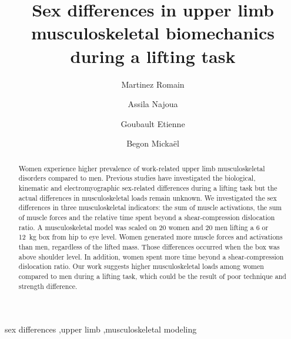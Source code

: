 \documentclass[preprint,review,12pt]{elsarticle}
\begin{document}
    \begin{frontmatter}

        \title{Sex differences in upper limb musculoskeletal biomechanics during a lifting task}



        \author{Martinez Romain}
        \author{Assila Najoua}
        \author{Goubault Etienne}
        \author{Begon Mickaël}

        \address{School of Kinesiology and Exercise Science, Faculty of Medicine, University of Montreal}

        \begin{abstract}
            Women experience higher prevalence of work-related upper limb musculoskeletal disorders compared to men.
            Previous studies have investigated the biological, kinematic and electromyographic sex-related differences during a lifting task but the actual differences in musculoskeletal loads remain unknown.
            We investigated the sex differences in three musculoskeletal indicators: the sum of muscle activations, the sum of muscle forces and the relative time spent beyond a shear-compression dislocation ratio.
            A musculoskeletal model was scaled on 20 women and 20 men lifting a 6 or 12~kg box from hip to eye level.
            Women generated more muscle forces and activations than men, regardless of the lifted mass.
            Those differences occurred when the box was above shoulder level.
            In addition, women spent more time beyond a shear-compression dislocation ratio.
            Our work suggests higher musculoskeletal loads among women compared to men during a lifting task, which could be the result of poor technique and strength difference.
        \end{abstract}

        \begin{keyword}
            sex differences \sep upper limb \sep musculoskeletal modeling


        \end{keyword}

    \end{frontmatter}
\end{document}
